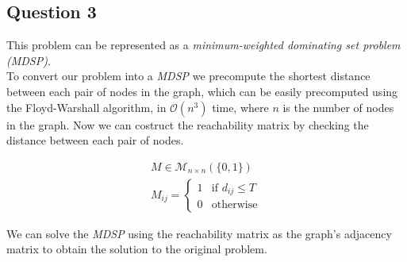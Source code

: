 \subsection*{Question 3}

This problem can be represented as a \textit{minimum-weighted dominating set problem (MDSP)}.  \\

To convert our problem into a \textit{MDSP} we precompute the shortest distance between each pair of nodes in the graph, which can be easily precomputed using the Floyd-Warshall algorithm, in $\mathcal{O}(n^3)$ time, where $n$ is the number of nodes in the graph.
Now we can costruct the reachability matrix by checking the distance between each pair of nodes.

\begin{align*}
	M \in \mathcal{M}_{n \times n} (\{0, 1\})  \\
	M_{ij} = \begin{cases}
		1 & \text{if } d_{ij} \leq T \\
		0 & \text{otherwise}
	\end{cases}
\end{align*}

We can solve the \textit{MDSP} using the reachability matrix as the graph's adjacency matrix to obtain the solution to the original problem.

